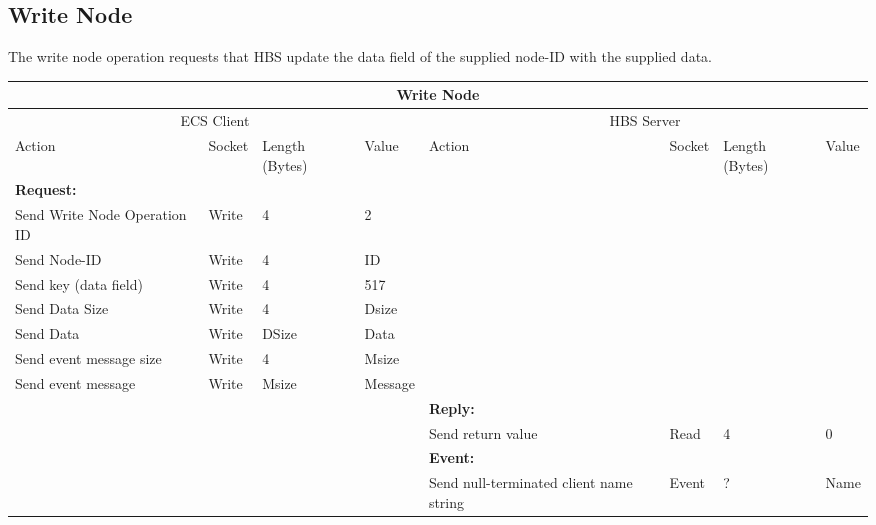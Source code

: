 \newpage
\subsection{Write Node}

The write node operation requests that HBS update the data field of the supplied node-ID
with the supplied data. 


\bigskip
\small
\begin{tabular}{|p{1.2in}|p{.4in}|p{.4in}|p{.5in}|p{1.2in}|p{.4in}|p{.4in}|p{.5in} |} \hline
\multicolumn{8}{|c|}{{\bf Write Node}} \\ \hline
\multicolumn{4}{|c|}{ECS Client} & \multicolumn{4}{|c|}{HBS Server} \\ \hline
Action            & Socket & Length  
                            (Bytes)& Value & Action       & Socket & Length 
                                                                    (Bytes)& Value \\ \hline
\multicolumn{4}{|l}{{\bf Request:}}&\multicolumn{4}{|l|}{~} \\ \hline
Send Write Node Operation ID  & Write  & 4     & 2     &              &        &       &       \\ \hline
Send Node-ID      & Write  & 4     &  ID &           &        &       &       \\ \hline
Send key (data field)   & Write  & 4     & 517   &              &        &       &       \\ \hline
Send Data Size    & Write  & 4     &  Dsize &        &        &       &       \\ \hline
Send Data         & Write  &  DSize &  Data &   &        &       &       \\ \hline
Send event
message size      & Write  & 4     &  Msize &         &        &       &       \\ \hline
Send event message
                  & Write  &  Msize  &  Message &     &        &       &       \\ \hline
\multicolumn{4}{|l}{~}&\multicolumn{4}{|l|}{{\bf Reply:}} \\ \hline
                  &        &       &       & Send return
                                             value        & Read   &  4    & 0       \\ \hline
\multicolumn{4}{|l}{~}&\multicolumn{4}{|l|}{{\bf Event:}} \\ \hline
                  &        &       &       & Send null-terminated client
                                             name string  & Event  &  ?    & Name  \\ \hline

\end{tabular}
